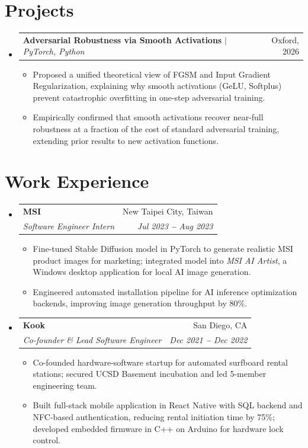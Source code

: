 \documentclass[letterpaper,11pt]{article}
\makeatletter
\newcommand{\resumeItem}[1]{
  \item\small{
    {#1 \vspace{-1pt}}
  }
}
\newcommand{\resumeSubheading}[4]{
  \vspace{-2pt}\item
    \begin{tabular*}{0.97\textwidth}[t]{l@{\extracolsep{\fill}}r}
      \textbf{#1} & #2 \\
      \textit{\small#3} & \textit{\small #4} \\
    \end{tabular*}\vspace{-2pt}
}
\newcommand{\resumeProjectHeading}[2]{
    \vspace{-2pt}\item
    \begin{tabular*}{0.97\textwidth}{l@{\extracolsep{\fill}}r}
      \small#1 & #2 \\
    \end{tabular*}\vspace{-5pt}
}
\newcommand{\resumeSubHeadingListStart}{\begin{itemize}[leftmargin=0.15in, label={}]}
\newcommand{\resumeSubHeadingListEnd}{\end{itemize}}
\newcommand{\resumeItemListStart}{\begin{itemize}\vspace{-2pt}}
\newcommand{\resumeItemListEnd}{\end{itemize}\vspace{-7pt}}
\makeatother
\begin{document}

\section{Projects}
\resumeSubHeadingListStart

  \resumeProjectHeading
    {\textbf{Adversarial Robustness via Smooth Activations} $|$ \textit{PyTorch, Python}}{Oxford, 2026}
    \resumeItemListStart
      \resumeItem{Proposed a unified theoretical view of FGSM and Input Gradient Regularization, explaining why smooth activations (GeLU, Softplus) prevent catastrophic overfitting in one-step adversarial training.}
      \resumeItem{Empirically confirmed that smooth activations recover near-full robustness at a fraction of the cost of standard adversarial training, extending prior results to new activation functions.}
    \resumeItemListEnd

\resumeSubHeadingListEnd


\section{Work Experience}
\resumeSubHeadingListStart

  \resumeSubheading
    {MSI}{New Taipei City, Taiwan}
    {Software Engineer Intern}{Jul 2023 \textbf{--} Aug 2023}
    \resumeItemListStart
      \resumeItem{Fine-tuned Stable Diffusion model in PyTorch to generate realistic MSI product images for marketing; integrated model into \textit{MSI AI Artist}, a Windows desktop application for local AI image generation.}
      \resumeItem{Engineered automated installation pipeline for AI inference optimization backends, improving image generation throughput by 80\%.}
    \resumeItemListEnd

  \resumeSubheading
    {Kook}{San Diego, CA}
    {Co-founder \& Lead Software Engineer}{Dec 2021 \textbf{--} Dec 2022}
    \resumeItemListStart
      \resumeItem{Co-founded hardware-software startup for automated surfboard rental stations; secured UCSD Basement incubation and led 5-member engineering team.}
      \resumeItem{Built full-stack mobile application in React Native with SQL backend and NFC-based authentication, reducing rental initiation time by 75\%; developed embedded firmware in C++ on Arduino for hardware lock control.}
    \resumeItemListEnd

\resumeSubHeadingListEnd
\end{document}
